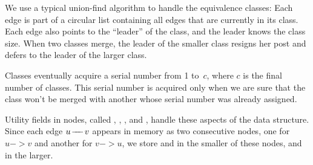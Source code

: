 We use a typical union-find algorithm to handle the
equivalence
classes: Each edge is part of a circular list containing all edges
that are currently in its class. Each edge also points to the
``leader'' of the class, and the leader knows the class size.
When two classes merge, the leader of the smaller class resigns her
post and defers to the leader of the larger class.

Classes eventually acquire a serial number from 1 to~$c$, where $c$ is
the final number of classes. This serial number is acquired only when
we are sure that the class won't be merged with another whose serial
number was already assigned.

Utility fields in  nodes, called , , %
, and ,
handle these aspects of the data structure. Since each edge $u\mathrel{\!\mathrel-\mkern-8mu\mathrel-\mkern-8mu\mathrel-\!} v$
appears in memory as two consecutive  nodes,
one for $u->v$ and another for $v->u$, we
store  and  in the smaller of these nodes,
 and  in the larger.

